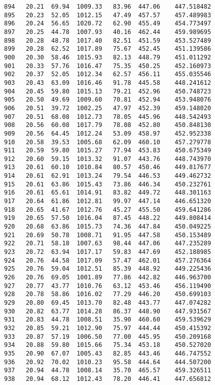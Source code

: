 \documentclass[11pt]{article}
\begin{document}
\begin{tcolorbox}[breakable, size=fbox, boxrule=.5pt, pad at break*=1mm, opacityfill=0]
\begin{Verbatim}[commandchars=\\\{\}]
894   20.21  69.94  1009.33   83.96  447.06    447.518482
895   20.23  52.05  1012.15   47.49  457.57    457.489983
896   20.24  56.65  1020.72   62.90  455.49    454.773497
897   20.25  44.78  1007.93   40.16  462.44    459.989695
898   20.28  48.78  1017.40   82.51  451.59    453.527489
899   20.28  62.52  1017.89   75.67  452.45    451.139586
900   20.30  58.46  1015.93   82.13  448.79    451.011292
901   20.33  57.76  1016.47   75.35  450.25    452.160973
902   20.37  52.05  1012.34   62.57  456.11    455.035546
903   20.43  63.09  1016.46   91.78  445.58    448.241612
904   20.45  59.80  1015.13   79.21  452.96    450.748723
905   20.50  49.69  1009.60   70.81  452.94    453.948076
906   20.51  39.72  1002.25   47.97  452.39    459.148020
907   20.51  68.08  1012.73   78.05  445.96    448.542493
908   20.56  60.08  1017.79   78.08  452.80    450.848130
909   20.56  64.45  1012.24   53.09  458.97    452.952338
910   20.58  39.53  1005.68   62.09  460.10    457.279778
911   20.59  59.80  1015.27   77.94  453.83    450.675349
912   20.60  59.15  1013.32   91.07  443.76    448.743970
913   20.61  60.10  1010.84   80.57  450.46    449.817677
914   20.61  62.91  1013.24   79.54  446.53    449.462732
915   20.61  63.86  1015.43   73.86  446.34    450.232761
916   20.61  65.61  1014.91   83.82  449.72    448.301163
917   20.64  61.86  1012.81   99.97  447.14    446.651320
918   20.65  41.67  1012.76   45.27  455.50    459.641286
919   20.65  57.50  1016.04   87.45  448.22    449.808414
920   20.68  63.86  1015.73   74.36  447.84    450.049225
921   20.69  50.78  1008.71   91.95  447.58    450.153489
922   20.71  58.18  1007.63   98.44  447.06    447.235289
923   20.72  63.94  1017.17   59.83  447.69    452.188985
924   20.76  44.58  1017.09   57.47  462.01    457.276364
925   20.76  59.04  1012.51   85.39  448.92    449.225436
926   20.76  69.05  1001.89   77.86  442.82    446.963700
927   20.77  43.77  1010.76   63.12  453.46    456.119490
928   20.78  58.86  1016.02   77.29  446.20    450.699103
929   20.80  69.45  1013.70   82.48  443.77    447.074282
930   20.82  63.77  1014.28   86.37  448.90    447.931567
931   20.83  44.78  1008.51   35.90  460.60    459.539629
932   20.85  59.21  1012.90   75.97  444.44    450.415392
933   20.87  57.19  1006.50   77.00  445.95    450.209168
934   20.88  59.80  1015.66   75.34  453.18    450.527020
935   20.90  67.07  1005.43   82.85  443.46    446.747552
936   20.92  70.02  1010.23   95.58  444.64    444.507200
937   20.94  44.78  1008.14   35.70  465.57    459.326511
938   20.94  68.12  1012.43   78.20  446.41    447.656812

\end{Verbatim}
\end{tcolorbox}
\end{document}
